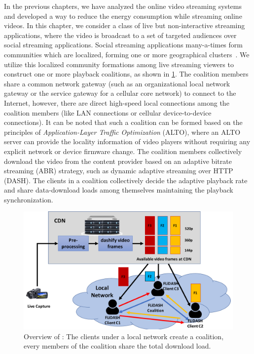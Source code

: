 In the previous chapters, we have analyzed the online video streaming systems and developed a way to reduce the energy consumption while streaming online videos. In this chapter, we consider a class of live but non-interactive streaming applications, where the video is broadcast to a set of targeted audiences over social streaming applications. Social streaming applications many-a-times form communities which are localized, forming one or more geographical clusters~\cite{wang2016anatomy}. We utilize this localized community formations among live streaming viewers to construct one or more playback coalitions, as shown in \fig\ref{fig:chap06:flsd}. The coalition members share a common network gateway (such as an organizational local network gateway or the service gateway for a cellular core network) to connect to the Internet, however, there are direct high-speed local connections among the coalition members (like LAN connections or cellular device-to-device connections). It can be noted that such a coalition can be formed based on the principles of \textit{Application-Layer Traffic Optimization} (ALTO), where an ALTO server can provide the locality information of video players without requiring any explicit network or device firmware change. The coalition members collectively download the video from the content provider based on an adaptive bitrate streaming (ABR) strategy, such as dynamic adaptive streaming over HTTP (DASH).  The clients in a coalition collectively decide the adaptive playback rate and share data-download loads among themselves maintaining the playback synchronization. 
\begin{figure}[!ht]
    \centering
    \includegraphics[width=0.8\linewidth]{img/flsd.pdf}
    \caption{Overview of \our: The clients under a local network create a coalition, every members of the coalition share the total download load.}
    \label{fig:chap06:flsd}
\end{figure}

